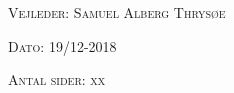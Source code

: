 \begin{center}
\begin{center}
\begin{tabular}{l c r}
			
		\end{tabular}
	\end{center}
	\vspace{0.5 in}
	
	\textsc{\large Vejleder: Samuel Alberg Thrysøe}
	\vspace{0.5 in}
	
	\textsc{\large Dato: 19/12-2018}\\
	\vspace{0.5 in}
	
	
	\textsc{Antal sider: xx} \\
	\vfill %
	
\end{center} %

\clearpage

\newpage